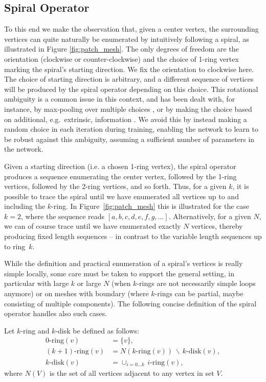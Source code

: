 \documentclass[runningheads]{llncs}
\begin{document}
 \subsection{Spiral Operator}
To this end we make the observation that, given a center vertex, the surrounding vertices can quite naturally be enumerated by intuitively following a spiral, as illustrated in Figure \ref{fig:patch_mesh}. The only degrees of freedom are the orientation (clockwise or counter-clockwise) and the choice of 1-ring vertex marking the spiral's starting direction. We fix the orientation to clockwise here. The choice of starting direction is arbitrary, and a different sequence of vertices will be produced by the spiral operator depending on this choice. This rotational ambiguity is a common issue in this context, and has been dealt with, for instance, by max-pooling over multiple choices \cite{masci2015geodesic}, or by making the choice based on additional, e.g.\ extrinsic, information \cite{boscaini2016learning}.
We avoid this by instead making a random choice in each iteration during training, enabling the network to learn to be robust against this ambiguity, assuming a sufficient number of parameters in the network.


Given a starting direction (i.e. a chosen 1-ring vertex), the spiral operator produces a sequence enumerating the center vertex, followed by the 1-ring vertices, followed by the 2-ring vertices, and so forth. Thus, 
for a given $k$, it is possible to trace the spiral until we have enumerated all vertices up to and including the $k$-ring.
In Figure~\ref{fig:patch_mesh} this is illustrated for the case $k=2$, where the sequence reads $[a,b,c,d,e,f,g,\ldots]$. Alternatively, for a given $N$, we can of course trace until we have enumerated exactly $N$ vertices, thereby producing fixed length sequences -- in contrast to the variable length sequences up to ring~$k$.

While the definition and practical enumeration of a spiral's vertices is really simple locally, some care must be taken to support the general setting, in particular with large $k$ or large $N$ (when $k$-rings are not necessarily simple loops anymore) or on meshes with boundary (where $k$-rings can be partial, maybe consisting of multiple components). The following concise definition of the spiral operator handles also such cases.

Let $k$-ring and $k$-disk be defined as follows:
\begin{align*}
    0\text{-ring}(v) &= \{v\}, \\
    (k\!+\!1)\text{-ring}(v) &= N(k\text{-ring}(v)) \,\backslash\, k\text{-disk}(v),\\
    k\text{-disk}(v) &= \cup_{i = 0 \dots k}\, i\text{-ring}(v),
\end{align*}
where $N(V)$ is the set of all vertices adjacent to any vertex in set $V$.
\end{document}

